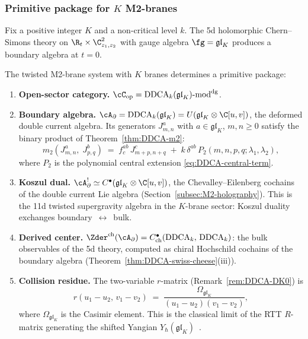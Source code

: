 \subsubsection{Primitive package for $K$ M2-branes}

Fix a positive integer $K$ and a non-critical level $k$.
The 5d holomorphic Chern--Simons theory on
$\R_t \times \C^2_{z_1,z_2}$ with gauge algebra
$\fg = \mathfrak{gl}_K$ produces a boundary algebra at $t = 0$.

\begin{theorem}
\label{thm:twisted-M2-primitive-package}
The twisted M2-brane system with $K$ branes determines a
primitive package:
\begin{enumerate}[label=\textup{(\roman*)},nosep]
\item \textbf{Open-sector category.}
 $\cC_{\mathrm{op}} = \mathrm{DDCA}_{k}(\mathfrak{gl}_K)\text{-}\mathrm{mod}^{\mathrm{dg}}$.

\item \textbf{Boundary algebra.}
 $\cA_\partial = \mathrm{DDCA}_k(\mathfrak{gl}_K)
 = U(\mathfrak{gl}_K \otimes \C[u,v])$,
 the deformed double current algebra. Its generators
 $J^a_{m,n}$ with $a \in \mathfrak{gl}_K$, $m,n \ge 0$
 satisfy the binary product of Theorem~\ref{thm:DDCA-m2}:
 \[
 m_2(J^a_{m,n},\; J^b_{p,q})
 \;=\;
 f^{ab}_c\, J^c_{m+p,n+q}
 \;+\;
 k\,\delta^{ab}\,
 P_2(m,n,p,q;\lambda_1,\lambda_2),
 \]
 where $P_2$ is the polynomial central extension
 \eqref{eq:DDCA-central-term}.

\item \textbf{Koszul dual.}
 $\cA_\partial^!
 \simeq C^\bullet(\mathfrak{gl}_K \otimes \C[u,v])$,
 the Chevalley--Eilenberg cochains of the double current
 Lie algebra \textup{(}Section~\ref{subsec:M2-holography}\textup{)}.
 This is the 11d twisted supergravity algebra in the
 $K$-brane sector: Koszul duality exchanges
 boundary~$\leftrightarrow$~bulk.

\item \textbf{Derived center.}
 $\Zder^{\mathrm{ch}}(\cA_\partial)
 = C^\bullet_{\mathrm{ch}}(\mathrm{DDCA}_k,\, \mathrm{DDCA}_k)$:
 the bulk observables of the 5d theory, computed as chiral
 Hochschild cochains of the boundary algebra
 \textup{(}Theorem~\ref{thm:DDCA-swiss-cheese}(iii)\textup{)}.

\item \textbf{Collision residue.}
 The two-variable $r$-matrix
 (Remark~\ref{rem:DDCA-DK0}) is
 \begin{equation}\label{eq:M2-r-matrix}
 r(u_1-u_2,\, v_1-v_2)
 \;=\;
 \frac{\Omega_{\mathfrak{gl}_K}}{(u_1-u_2)(v_1-v_2)},
 \end{equation}
 where $\Omega_{\mathfrak{gl}_K}$ is the Casimir element.
 This is the classical limit of the RTT $R$-matrix
 generating the shifted Yangian
 $Y_\hbar(\mathfrak{gl}_K)$~\cite{DNP2025,Guay2007}.


\end{enumerate}
\end{theorem}
